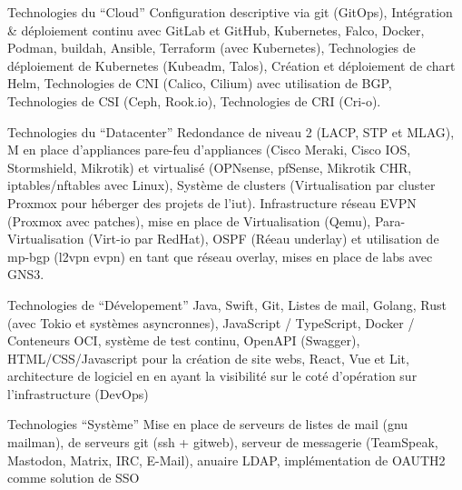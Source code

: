 
\begin{cvskills}

  \cvskill
    {Technologies du ``Cloud''}
    {
      Configuration descriptive via git (GitOps), Intégration \& déploiement continu avec GitLab et GitHub, \break
      Kubernetes, Falco, Docker, Podman, buildah, Ansible, Terraform (avec Kubernetes),                     \break
      Technologies de déploiement de Kubernetes (Kubeadm, Talos), Création et déploiement de chart Helm,    \break
      Technologies de CNI (Calico, Cilium) avec utilisation de BGP, Technologies de CSI (Ceph, Rook.io),    \break
      Technologies de CRI (Cri-o).
    } %

    \cvskill
    {Technologies du ``Datacenter''}
    {
      Redondance de niveau 2 (LACP, STP et  MLAG), M en place d'appliances pare-feu                         \break
      d'appliances (Cisco Meraki, Cisco IOS, Stormshield, Mikrotik) et virtualisé                           \break
      (OPNsense, pfSense, Mikrotik CHR, iptables/nftables avec Linux), Système de clusters                  \break
      (Virtualisation par cluster Proxmox pour héberger des projets de l'iut). Infrastructure réseau        \break
      EVPN (Proxmox avec patches), mise en place de Virtualisation (Qemu), Para-Virtualisation              \break
      (Virt-io par RedHat), OSPF (Réeau underlay) et utilisation de mp-bgp (l2vpn evpn) en tant que réseau  \break
      overlay, mises en place de labs avec GNS3.
    } %

    \cvskill
    {Technologies de ``Dévelopement''}
    {
      Java, Swift, Git, Listes de mail, Golang, Rust (avec Tokio et systèmes asyncronnes),                  \break
      JavaScript / TypeScript, Docker / Conteneurs OCI, système de test continu, OpenAPI (Swagger),         \break
      HTML/CSS/Javascript pour la création de site webs, React, Vue et Lit, architecture de logiciel en     \break
      en ayant la visibilité sur le coté d'opération sur l'infrastructure (DevOps)                          \break
    }

    \cvskill
    {Technologies ``Système''}
    {
      Mise en place de serveurs de listes de mail (gnu mailman), de serveurs git (ssh + gitweb), serveur de \break
      messagerie (TeamSpeak, Mastodon, Matrix, IRC, E-Mail), anuaire LDAP, implémentation de OAUTH2 comme   \break
      solution de SSO
    }

\end{cvskills}

